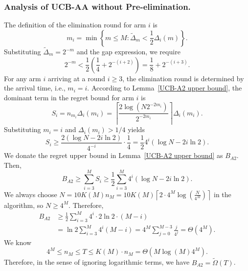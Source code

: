 \documentclass[11pt]{article}
\begin{document}
\subsubsection*{Analysis of UCB-AA without Pre-elimination.}
The definition of the elimination round for arm $i$ is
\[
m_i = \min \left\{ m \leq M :\tilde{\Delta}_m < \frac{1}{2}\Delta_i(m) \right\}.
\]
Substituting $\tilde{\Delta}_m = 2^{-m}$ and the gap expression, we require
\[
2^{-m} < \frac{1}{2}\left(\frac{1}{4} + 2^{-(i+2)}\right) = \frac{1}{8} + 2^{-(i+3)}.
\]
For any arm $i$ arriving at a round $i \ge 3$, the elimination round is determined by the arrival time, i.e., $m_i=i$.
According to  Lemma~\ref{UCB-A2 upper bound}, the dominant term in the regret bound for arm $i$ is
\[
S_i = n_{m_i} \Delta_i(m_i) = \left\lceil \frac{2 \log(N 2^{-2m_i})}{2^{-2m_i}} \right\rceil \Delta_i(m_i).
\]
Substituting $m_i = i$ and $\Delta_i(m_i) > 1/4$ yields
\[
S_i \ge \frac{2 (\log N - 2i \ln 2)}{4^{-i}} \cdot \frac{1}{4} = \frac{1}{2} 4^i (\log N - 2i \ln 2).
\]
We donate the regret upper bound in Lemma~\ref{UCB-A2 upper bound} as $B_{A2}$. Then,
\[
B_{A2} \geq  \sum_{i=3}^{M} S_i \geq \frac{1}{2} \sum_{i=3}^{M} 4^i (\log N - 2i \ln 2).
\]
We always choose $N=10K(M)n_{M}=10 K(M) \left\lceil 2\cdot 4^M\log\left(\frac{N}{4^M}\right) \right\rceil$ in the algorithm, so $N \geq 4^M$. Therefore,
\[
\begin{aligned}
B_{A2} &\geq \frac{1}{2} \sum_{i=3}^{M} 4^i \cdot 2 \ln 2 \cdot (M - i) \\
&= \ln 2 \sum_{i=3}^{M} 4^i (M - i)
 = 4^M \sum_{j=0}^{M-3} \frac{j}{4^j}=\Theta(4^M).
\end{aligned}
\]
We know
\[4^M \leq n_M\leq T\leq K(M)\cdot n_M = \Theta(M\log(M)4^M).\]
Therefore, in the sense of ignoring logarithmic terms, we have $B_{A2} =\tilde{\Omega}(T)$.
\end{document}
